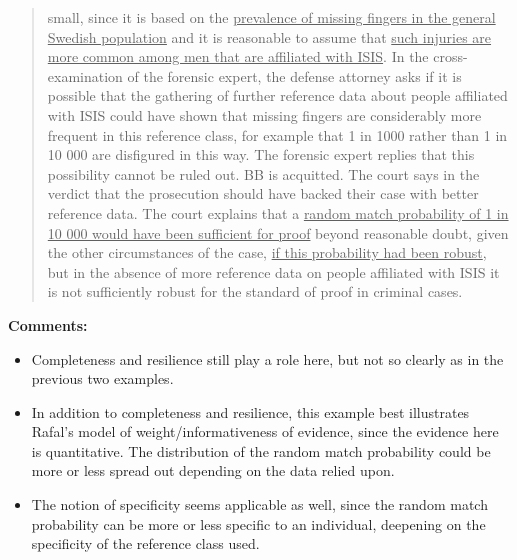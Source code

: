 \documentclass[
  10pt,
  dvipsnames,enabledeprecatedfontcommands]{scrartcl}
\providecommand{\tightlist}{%
  \setlength{\itemsep}{0pt}\setlength{\parskip}{0pt}}
\begin{document}
\begin{quote}
{small}, since it is based on the \underline{prevalence of missing fingers in the general Swedish population}
and it is reasonable to assume that \underline{such injuries are more common among men that are
affiliated with ISIS}. In the cross-examination of the forensic expert, the defense attorney asks if
it is possible that the gathering of further reference data about people affiliated with ISIS could
have shown that missing fingers are considerably more frequent in this reference class, for
example that 1 in 1000 rather than 1 in 10 000 are disfigured in this way. The forensic expert
replies that this possibility cannot be ruled out. BB is acquitted. The court says in the verdict
that the prosecution should have backed their case with better reference data. The court
explains that a \underline{random match probability of 1 in 10 000 would have been sufficient for proof}
beyond reasonable doubt, given the other circumstances of the case, \underline{if this probability had
been robust}, but in the absence of more reference data on people affiliated with ISIS it is not
sufficiently robust for the standard of proof in criminal cases. 
\end{quote}


\textbf{Comments:}

\begin{itemize}
\tightlist
\item
  Completeness and resilience still play a role here, but not so clearly
  as in the previous two examples.
\end{itemize}


\begin{itemize}
\tightlist
\item
  In addition to completeness and resilience, this example best
  illustrates Rafal's model of weight/informativeness of evidence, since
  the evidence here is quantitative. The distribution of the random
  match probability could be more or less spread out depending on the
  data relied upon.
\end{itemize}


\begin{itemize}
\tightlist
\item
  The notion of specificity seems applicable as well, since the random
  match probability can be more or less specific to an individual,
  deepening on the specificity of the reference class used.
\end{itemize}
\end{document}
